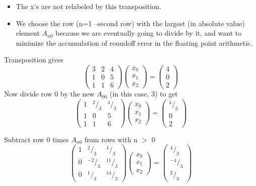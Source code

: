 \begin{itemize}
  \item The x's are not relabeled by this transposition. 
  \item We choose the row (n=1 --second row) with the largest (in
      absolute value) element $A_{n0}$ because we are eventually going
to divide by it, and want to minimize the accumulation of
roundoff error in the floating point arithmetic.  
\end{itemize}
Transposition gives
\begin{equation}
    \begin{pmatrix}
        3 &2 &4\\ 
        1 &0 &5\\ 
        1 &1 &6
    \end{pmatrix}
    \begin{pmatrix}
        x_0\\
        x_1\\
        x_2
    \end{pmatrix}
    =
    \begin{pmatrix}
        4\\
        0\\
        2
    \end{pmatrix}
\end{equation}
Now divide row 0 by the new $A_{00}$ (in this case, 3) to get
\begin{equation}
    \begin{pmatrix}
        1 &^2/_3 &^4/_3\\ 
        1 &0 &5\\ 
        1 &1 &6
    \end{pmatrix}
    \begin{pmatrix}
        x_0\\
        x_1\\
        x_2
    \end{pmatrix}
    =
    \begin{pmatrix}
        ^4/_3\\
        0\\
        2
    \end{pmatrix}
\end{equation}

Subtract row 0 times $A_{n0}$ from rows with n $>$ 0
\begin{equation}
    \begin{pmatrix}
        1 &^2/_3 &^4/_3\\ 
        0 &^{-2}/_3 &^{11}/_3\\ 
        0 &^1/_3 &^{14}/_3
    \end{pmatrix}
    \begin{pmatrix}
        x_0\\
        x_1\\
        x_2
    \end{pmatrix}
    =
    \begin{pmatrix}
        ^4/_3\\
        ^{-4}/_3\\
        ^2/_3
    \end{pmatrix}
\end{equation}

